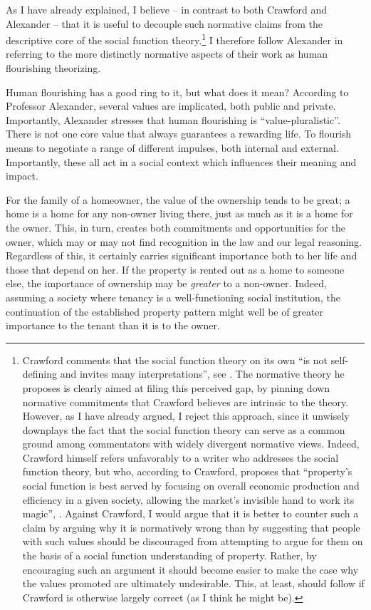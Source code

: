 As I have already explained, I believe -- in contrast to both Crawford and Alexander -- that it is useful to decouple such normative claims from the descriptive core of the social function theory.\footnote{Crawford comments that the social function theory on its own  ``is not self-defining and invites many interpretations'', see \cite[1089]{crawford12}. The normative theory he proposes is clearly aimed at filing this perceived gap, by pinning down normative commitments that Crawford believes are intrinsic to the theory. However, as I have already argued, I reject this approach, since it unwisely downplays the fact that the social function theory can serve as a common ground among commentators with widely divergent normative views. Indeed, Crawford himself refers unfavorably to a writer who addresses the social function theory, but who, according to Crawford, proposes that ``property's social function is best served by focusing on overall economic production and efficiency in a given society, allowing the market's invisible hand to work its magic'', \cite[see][1089]{crawford12}. Against Crawford, I would argue that it is better to counter such a claim by arguing why it is normatively wrong than by suggesting that people with such values should be discouraged from attempting to argue for them on the basis of a social function understanding of property. Rather, by encouraging such an argument it should become easier to make the case why the values promoted are ultimately undesirable. This, at least, should follow if Crawford is otherwise largely correct (as I think he might be).} I therefore follow Alexander in referring to the more distinctly normative aspects of their work as human flourishing theorizing. 

Human flourishing has a good ring to it, but what does it mean? According to Professor Alexander, several values are implicated, both public and private. Importantly, Alexander stresses that human flourishing is ``value-pluralistic''. There is not one core value that always guarantees a rewarding life. To flourish means to negotiate a range of different impulses, both internal and external. Importantly, these all act in a social context which influences their meaning and impact.

For the family of a homeowner, the value of the ownership tends to be great; a home is a home for any non-owner living there, just as much as it is a home for the owner. This, in turn, creates both commitments and opportunities for the owner, which may or may not find recognition in the law and our legal reasoning. Regardless of this, it certainly carries significant importance both to her life and those that depend on her. If the property is rented out as a home to someone else, the importance of ownership may be {\it greater} to a non-owner. Indeed, assuming a society where tenancy is a well-functioning social institution, the continuation of the established property pattern might well be of greater importance to the tenant than it is to the owner.

